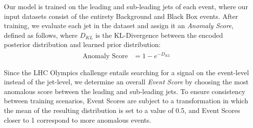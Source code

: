 \documentclass[letterpaper,11pt]{article}
\begin{document}
Our model is trained on the leading and sub-leading jets of each event, where our input datasets consist of the entirety Background and Black Box events. After training, we evaluate each jet in the dataset and assign it an \textit{Anomaly Score}, defined as follows, where $D_{KL}$ is the KL-Divergence between the encoded posterior distribution and learned prior distribution:
\begin{align*}
\text{Anomaly Score} &= 1 - e^{-\overline{D_{KL}}}
\end{align*}


Since the LHC Olympics challenge entails searching for a signal on the event-level instead of the jet-level, we determine an overall \textit{Event Score} by choosing the most anomalous score between the leading and sub-leading jets. To ensure consistency between training scenarios, Event Scores are subject to a transformation in which the mean of the resulting distribution is set to a value of 0.5, and Event Scores closer to 1 correspond to more anomalous events. 

\end{document}

